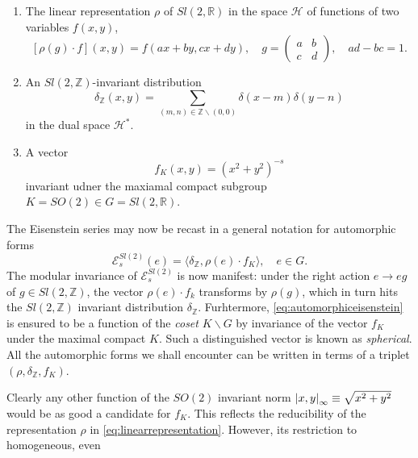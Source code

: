 \begin{enumerate}[label=(\roman*)]
  \item The linear representation $\rho$ of $Sl(2,\mathbb{R})$ in the space
    $\mathcal{H}$ of functions of two variables $f(x,y)$,
    \begin{equation}
      \left[\rho(g)\cdot f\right](x,y) = f(ax+by, cx+dy),\quad g=
      \begin{pmatrix}
        a & b\\
        c & d
      \end{pmatrix}
      ,\quad
      ad-bc =1.
    \end{equation}
  \item An $Sl(2,\mathbb{Z})$-invariant distribution
    \begin{equation}
      \delta_{\mathbb{Z}}(x,y) = \sum_{(m,n)\in\mathbb{Z}\backslash (0,0)}
    \delta(x-m)\delta(y-n)
    \label{eq:sumsldistribution}
  \end{equation}
  in the dual space $\mathcal{H}^*$.
\item A vector
  \begin{equation}
    f_K(x,y)=(x^2+y^2)^{-s}
  \end{equation}
  invariant udner the maxiamal compact subgroup $K = SO(2) \in
  G = Sl(2,\mathbb{R})$.
\end{enumerate}
The Eisenstein series may now be recast in a  general notation for automorphic
forms
\begin{equation}
\mathcal{E}_s^{Sl(2)}(e) = \langle \delta_{\mathbb{Z}}, \rho(e)\cdot
f_K\rangle,\quad e\in G.
\label{eq:automorphiceisenstein}
\end{equation}
The modular invariance of $\mathcal{E}_s^{Sl(2)}$ is now manifest: under the
right action $e\rightarrow eg$ of $g\in Sl(2,\mathbb{Z})$, the vector
$\rho(e)\cdot f_k$ transforms by $\rho(g)$, which in turn hits the
$Sl(2,\mathbb{Z})$ invariant distribution $\delta_{\mathbb{Z}}$. Furhtermore,
\eqref{eq:automorphiceisenstein} is ensured to be a function of the
\textit{coset} $K\backslash G$ by invariance of the vector $f_K$ under the
maximal compact $K$. Such a distinguished vector is known as
\textit{spherical}. All the automorphic forms we shall encounter can be written
in terms of a triplet $(\rho,\delta_{\mathbb{Z}},f_K)$.
\par Clearly any other function of the $SO(2)$ invariant norm
$\abs{x,y}_\infty\equiv \sqrt{x^2+y^2}$ would be as good a candidate for
$f_K$. This reflects the reducibility of the representation $\rho$ in
\eqref{eq:linearrepresentation}. However, its restriction to homogeneous, even
